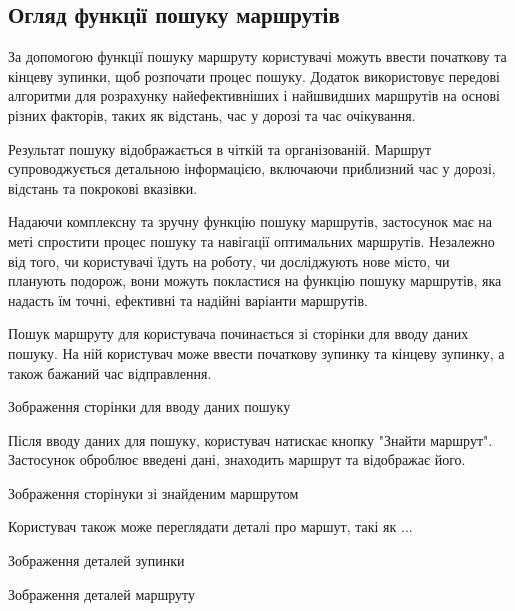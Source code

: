 \subsection{Огляд функції пошуку маршрутів}
\label{subsec:route-management-subsection}

За допомогою функції пошуку маршруту користувачі можуть ввести початкову та кінцеву зупинки, щоб розпочати процес пошуку. Додаток використовує передові алгоритми для розрахунку найефективніших і найшвидших маршрутів на основі різних факторів, таких як відстань, час у дорозі та час очікування.

Результат пошуку відображається в чіткій та організованій. Маршрут супроводжується детальною інформацією, включаючи приблизний час у дорозі, відстань та покрокові вказівки.

Надаючи комплексну та зручну функцію пошуку маршрутів, застосунок має на меті спростити процес пошуку та навігації оптимальних маршрутів. Незалежно від того, чи користувачі їдуть на роботу, чи досліджують нове місто, чи планують подорож, вони можуть покластися на функцію пошуку маршрутів, яка надасть їм точні, ефективні та надійні варіанти маршрутів.

Пошук маршруту для користувача починається зі сторінки для вводу даних пошуку. На ній користувач може ввести початкову зупинку та кінцеву зупинку, а також бажаний час відправлення.

Зображення сторінки для вводу даних пошуку

Після вводу даних для пошуку, користувач натискає кнопку "Знайти маршрут". Застосунок оброблює введені дані, знаходить маршрут та відображає його.

Зображення сторінуки зі знайденим маршрутом

Користувач також може переглядати деталі про маршут, такі як ...

Зображення деталей зупинки

Зображення деталей маршруту